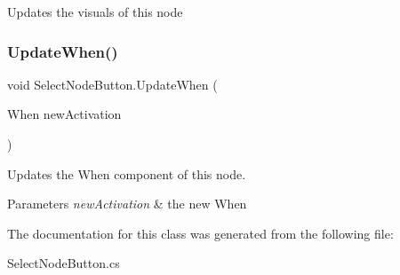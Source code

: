 Updates the visuals of this node 

\mbox{\label{class_select_node_button_a5c76435d61c0b3bfdc9e6b9ba64f8bc2}} 
\subsubsection{\texorpdfstring{Update\+When()}{UpdateWhen()}}
{\footnotesize\ttfamily void Select\+Node\+Button.\+Update\+When (\begin{DoxyParamCaption}\item[{When}]{new\+Activation }\end{DoxyParamCaption})}



Updates the When component of this node. 


\begin{DoxyParams}{Parameters}
{\em new\+Activation} & the new When \\
\hline
\end{DoxyParams}


The documentation for this class was generated from the following file\+:\begin{DoxyCompactItemize}
\item 
Select\+Node\+Button.\+cs\end{DoxyCompactItemize}
